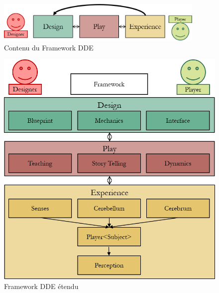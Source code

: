 \begin{figure}[H]
    \centering
    \includegraphics[width=10cm]{10_img/chap3/dpe.png} 
    \caption{Contenu du Framework DDE \cite{DDE}}
\end{figure}

\begin{figure}[H]
    \centering
    \includegraphics[width=14cm]{10_img/chap3/dde_extended_modif.png} 
    \caption{Framework DDE étendu \cite{DDE}}
\end{figure}

